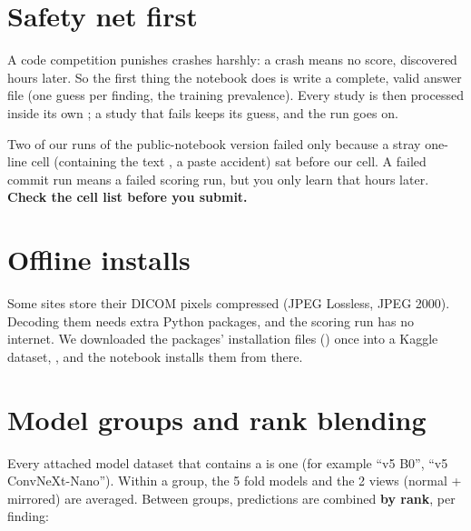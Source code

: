 \section{Safety net first}

\begin{keyidea}
A code competition punishes crashes harshly: a crash means no score, discovered hours later. So the first thing the
notebook does is write a complete, valid answer file (one guess per finding, the training prevalence). Every study is
then processed inside its own ; a study that fails keeps its guess, and the run goes on.
\end{keyidea}

\begin{watchout}
Two of our runs of the public-notebook version failed only because a stray one-line cell (containing the text
\code{[code]}, a paste accident) sat before our cell. A failed commit run means a failed scoring run, but you only
learn that  hours later. \textbf{Check the cell list before you submit.}
\end{watchout}

\section{Offline installs}

Some sites store their DICOM pixels compressed (JPEG Lossless, JPEG 2000). Decoding them needs extra Python packages,
and the scoring run has no internet. We downloaded the packages' installation files () once into a Kaggle
dataset, , and the notebook installs them from there.

\section{Model groups and rank blending}

Every attached model dataset that contains a  is one  (for example ``v5 B0'',
``v5 ConvNeXt-Nano''). Within a group, the 5 fold models and the 2 views (normal + mirrored) are averaged. Between
groups, predictions are combined \textbf{by rank}, per finding:


